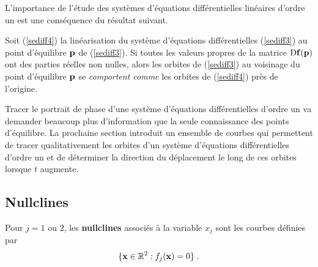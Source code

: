 {L'importance de l'étude des systèmes d'équations différentielles linéaires
d'ordre un est une conséquence du résultat suivant.

\begin{focus}{\prp} \label{HartGrob}
Soit (\ref{sediff4}) la linéarisation du système d'équations
différentielles (\ref{sediff3}) au point d'équilibre $\mathbf{p}$ de
(\ref{sediff3}).  Si toutes les valeurs propres de la matrice
$\mathrm{D} \mathbf{f}(\mathbf{p})$ ont des parties réelles non nulles, alors les
orbites de (\ref{sediff3}) au voisinage du point d'équilibre
$\mathbf{p}$ se {\em comportent comme} les orbites de (\ref{sediff4})
près de l'origine.
\end{focus}

Tracer le portrait de phase d'une système d'équations différentielles
d'ordre un va demander beaucoup plus d'information que la seule
connaissance des points d'équilibre.  La prochaine section introduit un
ensemble de courbes qui permettent de tracer qualitativement les
orbites d'un système d'équations différentielles d'ordre
un et de déterminer la direction du déplacement le long de ces
orbites lorsque $t$ augmente.

\subsection{Nullclines}

\begin{focus}{\dfn} 
Pour $j=1$ ou $2$, les {\bfseries nullclines} associés à la variable $x_j$
sont les courbes définies par
\[
\{ \mathbf{x}\in \mathbb{R}^2 : f_j(\mathbf{x})=0 \} \; .
\]
\end{focus}

}
